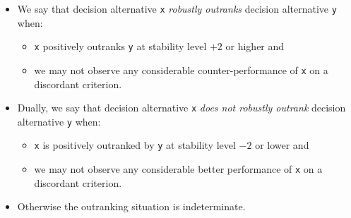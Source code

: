 \begin{definition}\label{def:19.1}
\begin{itemize}
\item We say that decision alternative \texttt{x} \emph{robustly outranks} decision alternative \texttt{y} when:
\begin{itemize}[nosep]
\item \texttt{x} positively outranks \texttt{y} at stability level $+2$ or higher and
\item we may not observe any considerable counter-performance of \texttt{x} on a discordant criterion.
\end{itemize}
\item Dually, we say that decision alternative \texttt{x} \emph{does not robustly outrank} decision alternative \texttt{y} when:
\begin{itemize}[nosep]
\item \texttt{x} is positively outranked by \texttt{y} at stability level $-2$ or lower and
\item we may not observe any considerable better performance of \texttt{x} on a discordant criterion.
\end{itemize}
\item Otherwise the outranking situation is indeterminate.
\end{itemize}
\end{definition}

